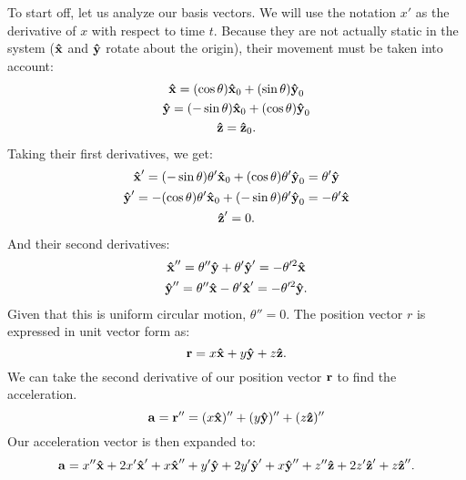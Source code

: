 To start off, let us analyze our basis vectors.
We will use the notation $x'$ as the derivative of $x$ with respect to time $t$.
Because they are not actually static in the system ($\uvec{x}$ and $\uvec{y}$ rotate about the origin), their movement must be taken into account:
\begin{gather*}
	\uvec{x} = (\cos\theta)\uvec{x}_0 + (\sin\theta)\uvec{y}_0 \\
	\uvec{y} = (-\sin\theta)\uvec{x}_0 + (\cos\theta)\uvec{y}_0 \\
	\uvec{z} = \uvec{z}_0 \text{.}
\end{gather*}
Taking their first derivatives, we get:
\begin{gather*}
	\uvec{x}' = (-\sin\theta)\theta'\uvec{x}_0 + (\cos\theta)\theta'\uvec{y}_0 = \theta'\uvec{y} \\
	\uvec{y}' = -(\cos\theta)\theta'\uvec{x}_0 + (-\sin\theta)\theta'\uvec{y}_0 = -\theta'\uvec{x} \\
	\uvec{z}' = 0 \text{.}
\end{gather*}
And their second derivatives:
\begin{gather*}
	\uvec{x}'' = \theta''\uvec{y} + \theta'\uvec{y}' =  - \theta'^2\uvec{x} \\
	\uvec{y}'' = \theta''\uvec{x} - \theta'\uvec{x}' =  - \theta'^2\uvec{y} \text{.}
\end{gather*}
Given that this is uniform circular motion, $\theta'' = 0$.
The position vector $r$ is expressed in unit vector form as:
\begin{equation*}
	\bvec{r} = x\uvec{x} + y\uvec{y} + z\uvec{z} \text{.}
\end{equation*}
We can take the second derivative of our position vector $\bm{\mathbf{r}}$ to find the acceleration.
\begin{equation*}
	\bvec{a} = \bvec{r}'' = (x\uvec{x})'' + (y\uvec{y})'' + (z\uvec{z})''
\end{equation*}
Our acceleration vector is then expanded to:
\begin{equation*}
	\bvec{a} = x''\uvec{x} + 2x'\uvec{x}' + x\uvec{x}'' + y'\uvec{y} + 2y'\uvec{y}' + x\uvec{y}'' + z''\uvec{z} + 2z'\uvec{z}' + z\uvec{z}'' \text{.}
\end{equation*}
